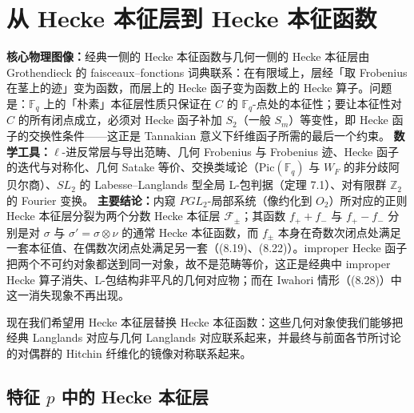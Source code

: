 

\section{从 Hecke 本征层到 Hecke 本征函数}

\begin{keytakeaway}
\textbf{核心物理图像：}经典一侧的 Hecke 本征函数与几何一侧的 Hecke 本征层由 Grothendieck 的 faisceaux--fonctions 词典联系：在有限域上，层经「取 Frobenius 在茎上的迹」变为函数，而层上的 Hecke 函子变为函数上的 Hecke 算子。问题是：$\mathbb{F}_q$ 上的「朴素」本征层性质只保证在 $C$ 的 $\mathbb{F}_q$-点处的本征性；要让本征性对 $C$ 的所有闭点成立，必须对 Hecke 函子补加 $S_2$（一般 $S_m$）等变性，即 Hecke 函子的交换性条件——这正是 Tannakian 意义下纤维函子所需的最后一个约束。
\textbf{数学工具：}$\ell$-进反常层与导出范畴、几何 Frobenius 与 Frobenius 迹、Hecke 函子的迭代与对称化、几何 Satake 等价、交换类域论（$\mathrm{Pic}(\mathbb{F}_q)$ 与 $W_F$ 的非分歧阿贝尔商）、$SL_2$ 的 Labesse--Langlands 型全局 L-包判据（定理 7.1）、对有限群 $\mathbb{Z}_2$ 的 Fourier 变换。
\textbf{主要结论：}内窥 $PGL_2$-局部系统（像约化到 $O_2$）所对应的正则 Hecke 本征层分裂为两个分数 Hecke 本征层 $\mathcal{F}_\pm$；其函数 $f_+ + f_-$ 与 $f_+ - f_-$ 分别是对 $\sigma$ 与 $\sigma' = \sigma\otimes\nu$ 的通常 Hecke 本征函数，而 $f_\pm$ 本身在奇数次闭点处满足一套本征值、在偶数次闭点处满足另一套（(8.19)、(8.22)）。improper Hecke 函子把两个不可约对象都送到同一对象，故不是范畴等价，这正是经典中 improper Hecke 算子消失、L-包结构非平凡的几何对应物；而在 Iwahori 情形（(8.28)）中这一消失现象不再出现。
\end{keytakeaway}

现在我们希望用 Hecke 本征层替换 Hecke 本征函数：这些几何对象使我们能够把经典 Langlands 对应与几何 Langlands 对应联系起来，并最终与前面各节所讨论的对偶群的 Hitchin 纤维化的镜像对称联系起来。

\subsection{特征 \texorpdfstring{$p$}{p} 中的 Hecke 本征层}

